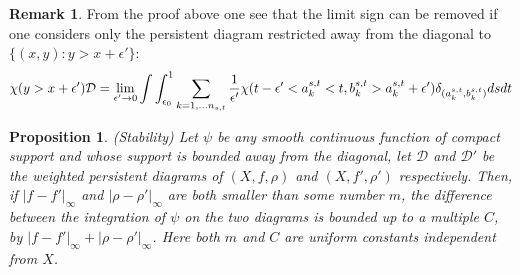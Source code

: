 \documentclass[11pt]{article}
\theoremstyle{plain}
\newtheorem{prop}[theorem]{Proposition}
\theoremstyle{definition}
\theoremstyle{definition}
\theoremstyle{definition}
\newtheorem{remark}[theorem]{Remark}
\theoremstyle{definition}
\theoremstyle{definition}
\theoremstyle{definition}
\theoremstyle{definition}
\theoremstyle{definition}
\begin{document}
\begin{remark}
From the proof above one see that the limit sign can be removed if one considers only the persistent diagram restricted away from the diagonal to $\{(x,y):y>x+\epsilon'\}$:
\begin{equation}
\chi(y>x+\epsilon')\mathcal{D}=\lim_{\epsilon'\rightarrow 0}\int\int_{\epsilon_0}^1\sum_{k=1,\dots n_{s,t}}{1\over\epsilon'}\chi(t-\epsilon'<a_k^{s,t}<t, b_k^{s,t}>a_k^{s,t}+\epsilon')\delta_{(a_k^{s,t}, b_k^{s,t})}dsdt
\end{equation}
\end{remark}

\begin{prop}(Stability) Let $\psi$ be any smooth continuous function of compact support and whose support is bounded away from the diagonal, let $\mathcal{D}$ and $\mathcal{D}'$ be the weighted persistent diagrams of $(X, f, \rho)$ and $(X, f', \rho')$ respectively. Then, if $|f-f'|_\infty$ and $|\rho-\rho'|_\infty$ are both smaller than some number $m$, the difference between the integration of $\psi$ on the two diagrams is bounded up to a multiple $C$, by $|f-f'|_\infty+|\rho-\rho'|_\infty$. Here both $m$ and $C$ are uniform constants independent from $X$.
\end{prop}
\end{document}
